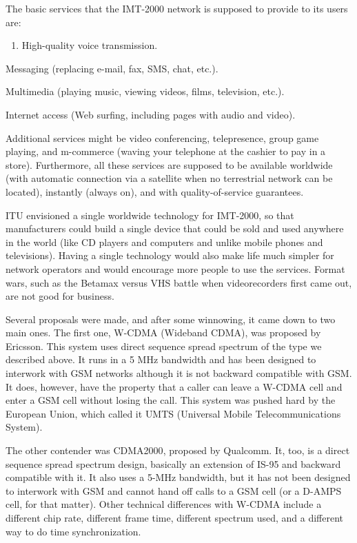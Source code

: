 \documentclass[b5paper,11pt]{memoir}
\begin{document}
The basic services that the IMT-2000 network is supposed to provide to
its users are:

{}

\begin{enumerate}
\def\labelenumi{\arabic{enumi}.}
\item
  {}

  High-quality voice transmission.
\end{enumerate}

{}

Messaging (replacing e-mail, fax, SMS, chat, etc.).

{}

Multimedia (playing music, viewing videos, films, television, etc.).

{}

Internet access (Web surfing, including pages with audio and video).

Additional services might be video conferencing, telepresence, group
game playing, and m-commerce (waving your telephone at the cashier to
pay in a store). Furthermore, all these services are supposed to be
available worldwide (with automatic connection via a satellite when no
terrestrial network can be located), instantly (always on), and with
quality-of-service guarantees.

ITU envisioned a single worldwide technology for IMT-2000, so that
manufacturers could build a single device that could be sold and used
anywhere in the world (like CD players and computers and unlike mobile
phones and televisions). Having a single technology would also make life
much simpler for network operators and would encourage more people to
use the services. Format wars, such as the Betamax versus VHS battle
when videorecorders first came out, are not good for business.

Several proposals were made, and after some winnowing, it came down to
two main ones. The first one, {W-CDMA} ({Wideband CDMA}), was proposed
by Ericsson. This system uses direct sequence spread spectrum of the
type we described above. It runs in a 5 MHz bandwidth and has been
designed to interwork with GSM networks although it is not backward
compatible with GSM. It does, however, have the property that a caller
can leave a W-CDMA cell and enter a GSM cell without losing the call.
This system was pushed hard by the European Union, which called it
{UMTS} ({Universal Mobile Telecommunications System}).

The other contender was {CDMA2000}, proposed by Qualcomm. It, too, is a
direct sequence spread spectrum design, basically an extension of IS-95
and backward compatible with it. It also uses a 5-MHz bandwidth, but it
has not been designed to interwork with GSM and cannot hand off calls to
a GSM cell (or a D-AMPS cell, for that matter). Other technical
differences with W-CDMA include a different chip rate, different frame
time, different spectrum used, and a different way to do time
synchronization.
\end{document}

